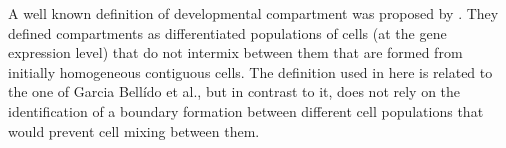 A well known definition of developmental compartment was proposed by \citet{Garcia-Bellido1973}. They defined compartments as differentiated populations of cells (at the gene expression level) that do not intermix between them that are formed from initially homogeneous contiguous cells. 
The definition used in here is related to the one of Garcia Bell\'{i}do et al., but in contrast to it, does not rely on the identification of a boundary formation between different cell populations that would prevent cell mixing between them.

%


